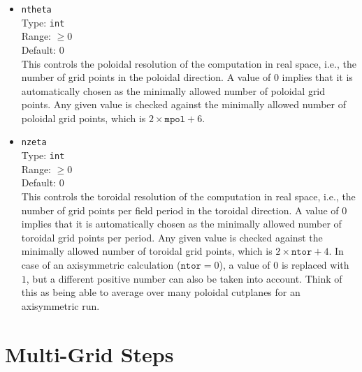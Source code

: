 \begin{itemize}
 \item \texttt{ntheta} \\
       Type: \texttt{int} \\
       Range: $\geq 0$ \\
       Default: 0 \\
       This controls the poloidal resolution of the computation in real space,
       i.e., the number of grid points in the poloidal direction.
       A value of $0$ implies that it is automatically chosen as the minimally allowed number of poloidal grid points.
       Any given value is checked against the minimally allowed number of poloidal grid points,
       which is $2 \times \texttt{mpol} + 6$.

 \item \texttt{nzeta} \\
       Type: \texttt{int} \\
       Range: $\geq 0$ \\
       Default: 0 \\
       This controls the toroidal resolution of the computation in real space,
       i.e., the number of grid points per field period in the toroidal direction.
       A value of $0$ implies that it is automatically chosen as the minimally allowed number of toroidal grid points per period.
       Any given value is checked against the minimally allowed number of toroidal grid points,
       which is $2 \times \texttt{ntor} + 4$.
       In case of an axisymmetric calculation ($\texttt{ntor} = 0$),
       a value of $0$ is replaced with $1$, but a different positive number can also be taken into account.
       Think of this as being able to average over many poloidal cutplanes for an axisymmetric run.

\end{itemize}

\section{Multi-Grid Steps}

